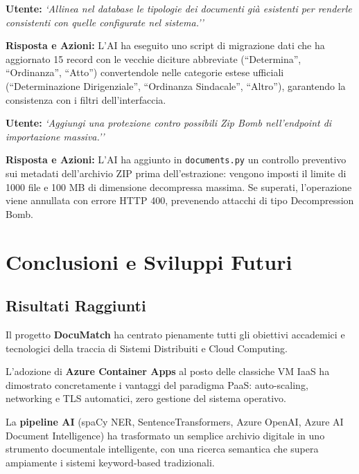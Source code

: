 \documentclass[12pt,a4paper,oneside]{report}
\begin{document}
\begin{promptbox}[title={Prompt 23 --- Allineamento Tipologie Esistenti nel Database}]
\textbf{Utente:} \textit{`Allinea nel database le tipologie dei documenti gi\`{a} esistenti per renderle consistenti con quelle configurate nel sistema.''}

\textbf{Risposta e Azioni:} L'AI ha eseguito uno script di migrazione dati che ha aggiornato 15 record con le vecchie diciture abbreviate (``Determina'', ``Ordinanza'', ``Atto'') convertendole nelle categorie estese ufficiali (``Determinazione Dirigenziale'', ``Ordinanza Sindacale'', ``Altro''), garantendo la consistenza con i filtri dell'interfaccia.
\end{promptbox}

\begin{promptbox}[title={Prompt 24 --- Protezione Anti-Zip Bomb per Importazione Massiva}]
\textbf{Utente:} \textit{`Aggiungi una protezione contro possibili Zip Bomb nell'endpoint di importazione massiva.''}

\textbf{Risposta e Azioni:} L'AI ha aggiunto in \texttt{documents.py} un controllo preventivo sui metadati dell'archivio ZIP prima dell'estrazione: vengono imposti il limite di 1000 file e 100 MB di dimensione decompressa massima. Se superati, l'operazione viene annullata con errore HTTP 400, prevenendo attacchi di tipo Decompression Bomb.
\end{promptbox}

\chapter{Conclusioni e Sviluppi Futuri}

\section{Risultati Raggiunti}

Il progetto \textbf{DocuMatch} ha centrato pienamente tutti gli obiettivi accademici
e tecnologici della traccia di Sistemi Distribuiti e Cloud Computing.

L'adozione di \textbf{Azure Container Apps} al posto delle classiche VM IaaS ha dimostrato
concretamente i vantaggi del paradigma PaaS: auto-scaling, networking e TLS automatici,
zero gestione del sistema operativo.

La \textbf{pipeline AI} (spaCy NER, SentenceTransformers, Azure OpenAI,
Azure AI Document Intelligence) ha trasformato un semplice archivio digitale in uno
strumento documentale intelligente, con una ricerca semantica che supera ampiamente
i sistemi keyword-based tradizionali.
\end{document}

